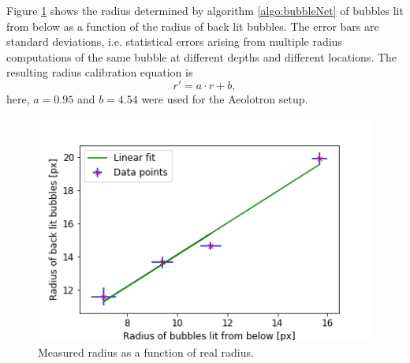 			Figure \ref{fig:radius_calib_result} shows the radius determined by algorithm \ref{algo:bubbleNet} of bubbles lit from below as a function of the radius of back lit bubbles. The error bars are standard deviations, i.e. statistical errors arising from multiple radius computations of the same bubble at different depths and different locations. The resulting radius calibration equation is 
			\begin{equation}
				r' = a \cdot r + b,
				\label{eq:radius_calib}
			\end{equation}
			here, $a= 0.95$ and $b=4.54$ were used for the Aeolotron setup. 
			
			\begin{figure}[h]
				\centering
				\includegraphics[scale=.6]{graphs/radius_calibration_result.png}
				\caption{Measured radius as a function of real radius.}
				\label{fig:radius_calib_result}
			\end{figure}
			
			
			
			
			
































